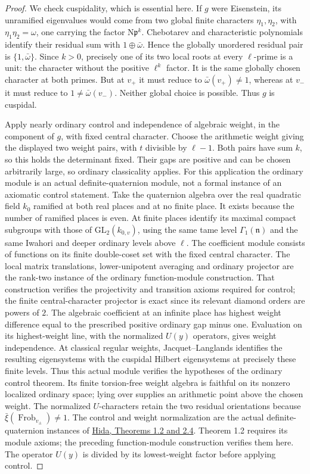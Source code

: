 \begin{proof}
We check cuspidality, which is essential here.
If \(g\) were Eisenstein, its unramified eigenvalues would come
from two global finite characters \(\eta_1,\eta_2\), with
\(\eta_1\eta_2=\omega\), one carrying the factor
\(\mathrm N\mathfrak p^k\).
Chebotarev and characteristic polynomials identify their
residual sum with \(1\oplus\bar\omega\).
Hence the globally unordered residual pair is
\(\{1,\bar\omega\}\).
Since \(k>0\), precisely one of its two local roots at every
\(\ell\)-prime is a unit: the character without the positive
\(\ell^k\) factor. It is the same globally chosen character at
both primes.
But at \(v_+\) it must reduce to \(\bar\omega(v_+)\ne1\),
whereas at \(v_-\) it must reduce to \(1\ne\bar\omega(v_-)\).
Neither global choice is possible. Thus \(g\) is cuspidal.

Apply nearly ordinary control and independence of algebraic
weight, in the component of \(g\), with fixed central character.
Choose the arithmetic weight giving the displayed two weight
pairs, with \(t\) divisible by \(\ell-1\).
Both pairs have sum \(k\), so this holds the determinant fixed.
Their gaps are positive and can be chosen arbitrarily large,
so ordinary classicality applies.
For this application the ordinary module is an actual
definite-quaternion module, not a formal instance of an
axiomatic control statement.
Take the quaternion algebra over the real quadratic field
\(k_0\) ramified at both real places and at no finite place.
It exists because the number of ramified places is even.
At finite places identify its maximal compact subgroups
with those of \(\mathrm{GL}_2(k_{0,v})\), using the same
tame level \(\Gamma_1(\mathfrak n)\) and the same Iwahori
and deeper ordinary levels above \(\ell\).
The coefficient module consists of functions on its finite
double-coset set with the fixed central character.
The local matrix translations, lower-unipotent averaging
and ordinary projector are the rank-two instance of the
ordinary function-module construction.
That construction verifies the projectivity and transition
axioms required for control; the finite central-character
projector is exact since its relevant diamond orders are
powers of \(2\).
The algebraic coefficient at an infinite place has highest
weight difference equal to the prescribed positive ordinary
gap minus one.
Evaluation on its highest-weight line, with the normalized
\(U(y)\) operators, gives weight independence.
At classical regular weights, Jacquet--Langlands identifies
the resulting eigensystems with the cuspidal Hilbert
eigensystems at precisely these finite levels.
Thus this actual module verifies the hypotheses of the
ordinary control theorem.
Its finite torsion-free weight algebra is faithful on its
nonzero localized ordinary space; lying over supplies an
arithmetic point above the chosen weight.
The normalized \(U\)-characters retain the two residual
orientations because \(\bar\xi(\operatorname{Frob}_{v_\pm})\ne1\).
The control and weight normalization are the actual
definite-quaternion instances of
\href{https://www.math.ucla.edu/~hida/Lum07.pdf}
{Hida, Theorems 1.2 and 2.4}.
Theorem 1.2 requires its module axioms; the preceding
function-module construction verifies them here.
The operator \(U(y)\) is divided by its lowest-weight factor
before applying control.


\end{proof}

